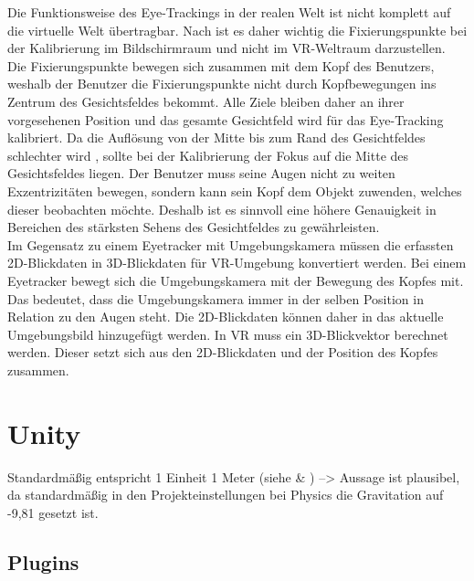 Die Funktionsweise des Eye-Trackings in der realen Welt ist nicht komplett auf die virtuelle Welt übertragbar. Nach \citeauthor{Clay_Koenig_Koenig_2019} ist es daher wichtig die Fixierungspunkte bei der Kalibrierung im Bildschirmraum und nicht im \ac{VR}-Weltraum darzustellen. Die Fixierungspunkte bewegen sich zusammen mit dem Kopf des Benutzers, weshalb der Benutzer die Fixierungspunkte nicht durch Kopfbewegungen ins Zentrum des Gesichtsfeldes bekommt. Alle Ziele bleiben daher an ihrer vorgesehenen Position und das gesamte Gesichtfeld wird für das Eye-Tracking kalibriert. Da die Auflösung von der Mitte bis zum Rand des Gesichtfeldes schlechter wird \cite{Kreylos.2017}, sollte bei der Kalibrierung der Fokus auf die Mitte des Gesichtsfeldes liegen. Der Benutzer muss seine Augen nicht zu weiten Exzentrizitäten bewegen, sondern kann sein Kopf dem Objekt zuwenden, welches dieser beobachten möchte. Deshalb ist es sinnvoll eine höhere Genauigkeit in Bereichen des stärksten Sehens des Gesichtfeldes zu gewährleisten. \cite{Clay_Koenig_Koenig_2019} \\ 
Im Gegensatz zu einem Eyetracker mit Umgebungskamera müssen die erfassten 2D-Blickdaten in 3D-Blickdaten für \ac{VR}-Umgebung konvertiert werden. Bei einem Eyetracker bewegt sich die Umgebungskamera mit der Bewegung des Kopfes mit. Das bedeutet, dass die Umgebungskamera immer in der selben Position in Relation zu den Augen steht. Die 2D-Blickdaten können daher in das aktuelle Umgebungsbild hinzugefügt werden. In \ac{VR} muss ein 3D-Blickvektor berechnet werden. Dieser setzt sich aus den 2D-Blickdaten und der Position des Kopfes zusammen. \cite{Clay_Koenig_Koenig_2019}

\section{Unity}
Standardmäßig entspricht 1 Einheit 1 Meter (siehe \cite{BrentAllard.2017} \& \cite{AVividLight.2010}) --> Aussage ist plausibel, da standardmäßig in den Projekteinstellungen bei Physics die Gravitation auf -9,81 gesetzt ist.

\subsection{Plugins}

